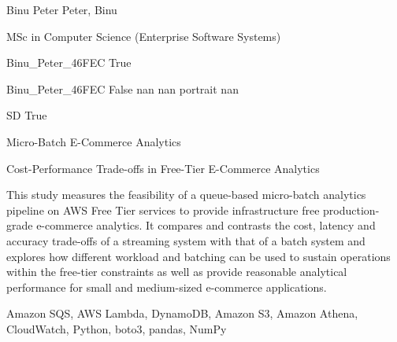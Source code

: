 \documentclass[twoside]{report}
\begin{document}
\begingroup{}\relax



\def\Key{Binu_Peter_46FEC}

{Binu Peter}
{Peter, Binu}

{MSc in Computer Science (Enterprise Software Systems)}

{Binu_Peter_46FEC}
{True}

{Binu_Peter_46FEC}
{False}
{nan}
{nan}
{portrait}
{nan}

{SD}
{True}

{Micro-Batch E-Commerce Analytics}

{Cost-Performance Trade-offs in Free-Tier E-Commerce Analytics}

{This study measures the feasibility of a queue-based micro-batch analytics pipeline on AWS Free Tier services to provide infrastructure free production-grade e-commerce analytics. It compares and contrasts the cost, latency and accuracy trade-offs of a streaming system with that of a batch system and explores how different workload and batching can be used to sustain operations within the free-tier constraints as well as provide reasonable analytical performance for small and medium-sized e-commerce applications.}

{Amazon SQS, AWS Lambda, DynamoDB, Amazon S3, Amazon Athena, CloudWatch, Python, boto3, pandas, NumPy}
\end{document}
